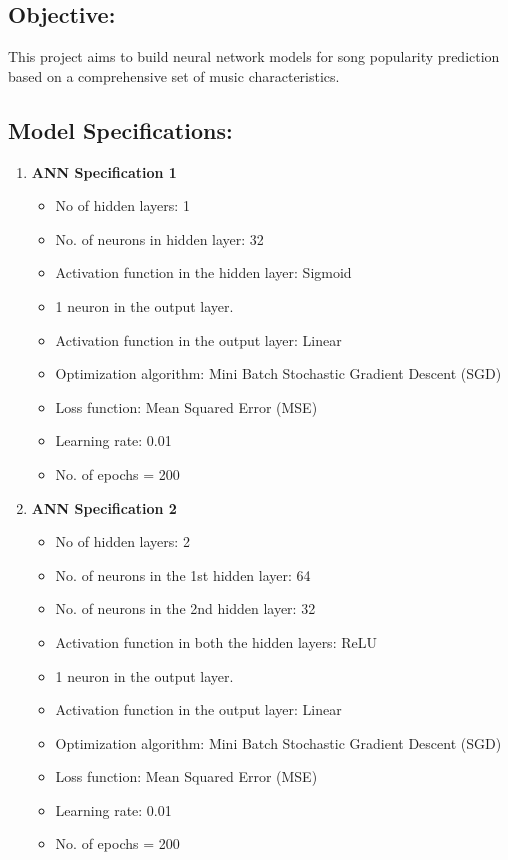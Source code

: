 \documentclass[12pt]{article}
\begin{document}
	\subsection{Objective:}
	This project aims to build neural network models for song popularity prediction based on a comprehensive set of music characteristics.
	
	\subsection{Model Specifications:} \label{subsec:model-specifications}
	\begin{enumerate}
		\item \textbf{ANN Specification 1}
		\begin{itemize}
			\item No of hidden layers: 1
			\item No. of neurons in hidden layer: 32
			\item Activation function in the hidden layer: Sigmoid
			\item 1 neuron in the output layer.
			\item Activation function in the output layer: Linear
			\item Optimization algorithm: Mini Batch Stochastic Gradient Descent (SGD)
			\item Loss function: Mean Squared Error (MSE)
			\item Learning rate: 0.01
			\item No. of epochs = 200
		\end{itemize}
		\item \textbf{ANN Specification 2}
		\begin{itemize}
			\item No of hidden layers: 2
			\item No. of neurons in the 1st hidden layer: 64
			\item No. of neurons in the 2nd hidden layer: 32
			\item Activation function in both the hidden layers: ReLU
			\item 1 neuron in the output layer.
			\item Activation function in the output layer: Linear
			\item Optimization algorithm: Mini Batch Stochastic Gradient Descent (SGD)
			\item Loss function: Mean Squared Error (MSE)
			\item Learning rate: 0.01
			\item No. of epochs = 200
		\end{itemize}
	\end{enumerate}
	
\end{document}
